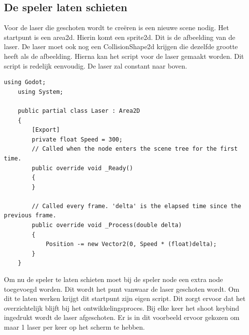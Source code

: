 \subsection{De speler laten schieten}
Voor de laser die geschoten wordt te creëren is een nieuwe scene nodig. Het startpunt is een area2d. Hierin komt een sprite2d. Dit is de afbeelding van de laser. De laser moet ook nog een CollisionShape2d krijgen die dezelfde grootte heeft als de afbeelding. Hierna kan het script voor de laser gemaakt worden. Dit script is redelijk eenvoudig. De laser zal constant naar boven.
\begin{lstlisting}[style=csharp]
    using Godot;
    using System;
    
    public partial class Laser : Area2D
    {
        [Export]
        private float Speed = 300;
        // Called when the node enters the scene tree for the first time.
        public override void _Ready()
        {
        }
        
        // Called every frame. 'delta' is the elapsed time since the previous frame.
        public override void _Process(double delta)
        {
            Position -= new Vector2(0, Speed * (float)delta);
        }
    }    
\end{lstlisting}

Om nu de speler te laten schieten moet bij de speler node een extra node toegevoegd worden. Dit wordt het punt vanwaar de laser geschoten wordt. Om dit te laten werken krijgt dit startpunt zijn eigen script. Dit zorgt ervoor dat het overzichtelijk blijft bij het ontwikkelingsproces. Bij elke keer het shoot keybind ingedrukt wordt de laser afgeschoten. Er is in dit voorbeeld ervoor gekozen om maar 1 laser per keer op het scherm te hebben.

